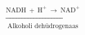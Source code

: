 \documentclass[preview]{standalone}
\begin{document}
\begin{align*}
\xrightarrow[\text{Alkoholi dehüdrogenaas}]{\text{NADH}\:+\:\text{H}^+\:\rightarrow\:\text{NAD}^+}
\end{align*}
\end{document}
